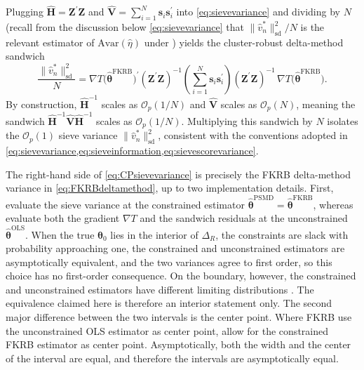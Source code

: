 Plugging $\hat{\bm{H}} = \bm{Z}^\prime\bm{Z}$ and $\hat{\bm{V}} = \sum_{i=1}^N \bm{s}_i\bm{s}_i^\prime$ into \cref{eq:sievevariance} and dividing by $N$ (recall from the discussion below \cref{eq:sievevariance} that $\|\hat{v}_n^*\|^2_{\mathrm{sd}}/N$ is the relevant estimator of $\mathrm{Avar}(\hat{\eta})$ under \citet[][theorem~4.2]{ChenPouzo2015}) yields the cluster-robust delta-method sandwich
\begin{equation}
\label{eq:CPsievevariance}
    \frac{\|\hat{v}^*_n\|^2_{\mathrm{sd}}}{N} = \nabla T\!\bigl(\hat{\bm{\theta}}^{\mathrm{FKRB}}\bigr)^\prime (\bm{Z}^\prime\bm{Z})^{-1}\!\left(\sum_{i=1}^N \bm{s}_i\bm{s}_i^\prime\right)\!(\bm{Z}^\prime\bm{Z})^{-1}\, \nabla T\!\bigl(\hat{\bm{\theta}}^{\mathrm{FKRB}}\bigr).
\end{equation}
By construction, $\hat{\bm{H}}^{-1}$ scales as $\mathcal{O}_p(1/N)$ and $\hat{\bm{V}}$ scales as $\mathcal{O}_p(N)$, meaning the sandwich $\hat{\bm{H}}^{-1}\hat{\bm{V}}\hat{\bm{H}}^{-1}$ scales as $\mathcal{O}_p(1/N)$. 
Multiplying this sandwich by $N$ isolates the $\mathcal{O}_p(1)$ sieve variance $\|\hat{v}_n^*\|^2_{\mathrm{sd}}$, consistent with the conventions adopted in \cref{eq:sievevariance,eq:sieveinformation,eq:sievescorevariance}.

The right-hand side of \cref{eq:CPsievevariance} is precisely the FKRB delta-method variance in \cref{eq:FKRBdeltamethod}, up to two implementation details.
First, \citet{ChenPouzo2015} evaluate the sieve variance at the constrained estimator $\hat{\bm{\theta}}^{\mathrm{PSMD}} = \hat{\bm{\theta}}^{\mathrm{FKRB}}$, whereas \citet{FoxKimRyanBajari2011} evaluate both the gradient $\nabla T$ and the sandwich residuals at the unconstrained $\hat{\bm{\theta}}^{\mathrm{OLS}}$.
When the true $\bm{\theta}_0$ lies in the interior of $\Delta_R$, the constraints are slack with probability approaching one, the constrained and unconstrained estimators are asymptotically equivalent, and the two variances agree to first order, so this choice has no first-order consequence.
On the boundary, however, the constrained and unconstrained estimators have different limiting distributions \citep{Andrews1999}.
The equivalence claimed here is therefore an interior statement only.
The second major difference between the two intervals is the center point.
Where FKRB use the unconstrained OLS estimator as center point, \citet{ChenPouzo2015} allow for the constrained FKRB estimator as center point.
Asymptotically, both the width and the center of the interval are equal, and therefore the intervals are asymptotically equal.

